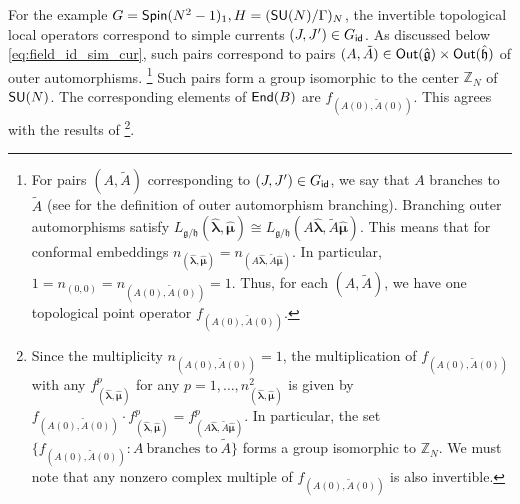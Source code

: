 \documentclass[a4paper,11pt]{article}
\newcommand{\bk}{\bm{k}}
\newcommand{\hblm}{\hat{\bm{\lambda}}}
\newcommand{\hbmu}{\hat{\bm{\mu}}}
\newcommand{\tsf}[1]{\textsf{#1}}
\newcommand{\wh}[1]{\widehat{#1}}
\def\IZ{{\mathds{Z}}}
\def\fg{\mathfrak{g}}
\def\fh{\mathfrak{h}}
\def\hfg{\hat{\mathfrak{g}}}
\def\hfh{\hat{\mathfrak{h}}}
\def\rem{$\clubsuit$}
\newcommand{\cg}[1]{\marginpar{\raggedright \tiny \rem #1 \rem}} %
\begin{document}
For the example $G=\mathsf{Spin}(N^2-1)_1,H=(\mathsf{SU}(N)/\Gamma)_N$, the invertible topological local operators correspond to simple currents $(J,J')\in G_{\mathsf{id}}$. As discussed below \eqref{eq:field_id_sim_cur}, such pairs correspond to pairs $(A,\tilde{A})\in\mr{Out}(\hfg)\times\mr{Out}(\hfh)$ of outer automorphisms. \footnote{For pairs $(A,\tilde A)$ corresponding to $(J,J')\in G_{\mathsf{id}}$, we say that $A$ branches to $\tilde A$ (see \cite[Section 14.7.3]{DiFrancesco:1997nk} for the definition of outer automorphism branching). Branching outer automorphisms satisfy $L_{\fg/\fh}(\hblm,\hbmu)\cong L_{\fg/\fh}(A\hblm,\tilde A\hbmu)$. This means that for conformal embeddings $n_{(\hblm,\hbmu)}=n_{(A\hblm,\tilde A\hbmu)}$. In particular, $1=n_{(0,0)}=n_{(A(0),\tilde A(0))}=1$. Thus, for each $(A,\tilde A)$, we have one topological point operator $f_{(A(0),\tilde A(0))}$.} Such pairs form a group isomorphic to the center $\IZ_N$ of $\mathsf{SU}(N)$. The corresponding elements of $\mathsf{End}(B)$ are  $f_{(A(0),\tilde A(0))}$. This agrees with the results of \cite{Komargodski:2020mxz} \footnote{Since the multiplicity $n_{(A(0),\tilde A(0))}=1$, the multiplication of $f_{(A(0),\tilde A(0))}$ with any $f_{(\hblm,\hbmu)}^p$ for any $p=1,\dots, n^2_{(\hblm,\hbmu)}$ is given by $f_{(A(0),\tilde A(0))}\cdot f_{(\hblm,\hbmu)}^p=f_{(A\hblm,\tilde{A}\hbmu)}^p$. In particular, the set $\{f_{(A(0),\tilde A(0))}:A~\text{branches to}~\tilde A\}$ forms a group isomorphic to $\IZ_N$. We must note that any nonzero complex multiple of $f_{(A(0),\tilde A(0))}$ is also invertible.}. 




%
%
%
\end{document}
